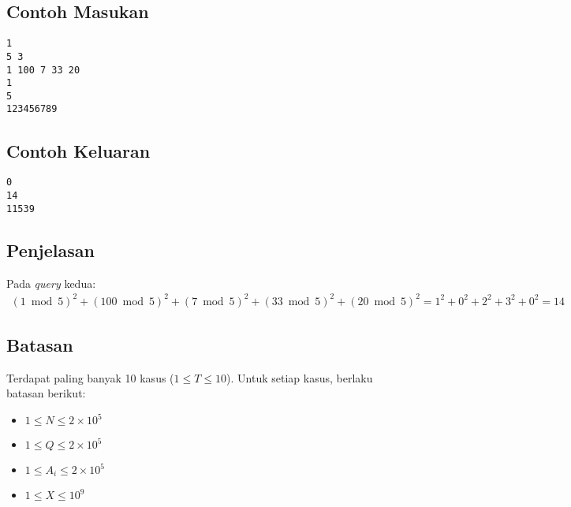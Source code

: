 \documentclass{article}
\begin{document}
\subsection*{Contoh Masukan}

\begin{lstlisting}
1
5 3
1 100 7 33 20
1
5
123456789
\end{lstlisting}

\subsection*{Contoh Keluaran}

\begin{lstlisting}
0
14
11539
\end{lstlisting}

\subsection*{Penjelasan}

\par Pada \textit{query} kedua:
\begin{gather*} 
(1 \bmod 5)^2 + (100 \bmod 5)^2 + (7 \bmod 5)^2 + (33 \bmod 5)^2 + (20 \bmod 5)^2 = 1^2 + 0^2 + 2^2 + 3^2 + 0^2 = 14
\end{gather*} 

\subsection*{Batasan}

\par Terdapat paling banyak 10 kasus ($1 \leq T\leq 10$). Untuk setiap kasus, berlaku batasan berikut:
\begin{itemize}
	\item $1 \leq N\leq 2\times 10^5$
	\item $1 \leq Q\leq 2\times 10^5$
	\item $1 \leq A_i\leq 2\times 10^5$
	\item $1 \leq X \leq 10^9$
\end{itemize}
\end{document}
